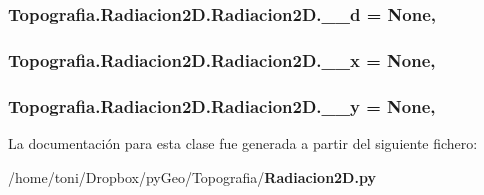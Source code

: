 \subsubsection[{\-\_\-\-\_\-d}]{\setlength{\rightskip}{0pt plus 5cm}Topografia.\-Radiacion2\-D.\-Radiacion2\-D.\-\_\-\-\_\-d = None\hspace{0.3cm}{\ttfamily [static]}, {\ttfamily [private]}}\label{classTopografia_1_1Radiacion2D_1_1Radiacion2D_a35dfce79898821f1a46bbc8087abbfd4}
\subsubsection[{\-\_\-\-\_\-x}]{\setlength{\rightskip}{0pt plus 5cm}Topografia.\-Radiacion2\-D.\-Radiacion2\-D.\-\_\-\-\_\-x = None\hspace{0.3cm}{\ttfamily [static]}, {\ttfamily [private]}}\label{classTopografia_1_1Radiacion2D_1_1Radiacion2D_a3319dfd20a78946b8898e0f2d46c58e0}
\subsubsection[{\-\_\-\-\_\-y}]{\setlength{\rightskip}{0pt plus 5cm}Topografia.\-Radiacion2\-D.\-Radiacion2\-D.\-\_\-\-\_\-y = None\hspace{0.3cm}{\ttfamily [static]}, {\ttfamily [private]}}\label{classTopografia_1_1Radiacion2D_1_1Radiacion2D_a97626eb4fcd78eb16a66f96f1d2ef5f7}


La documentación para esta clase fue generada a partir del siguiente fichero\-:\begin{DoxyCompactItemize}
\item 
/home/toni/\-Dropbox/py\-Geo/\-Topografia/{\bf Radiacion2\-D.\-py}\end{DoxyCompactItemize}
